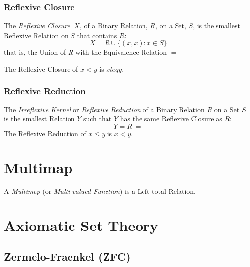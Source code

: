 \documentclass{article}
\begin{document}
\subsubsection{Reflexive Closure}\label{subsec:reflexive_closure}

The \emph{Reflexive Closure}, $X$, of a Binary Relation, $R$, on a
Set, $S$, is the smallest Reflexive Relation on $S$ that contains $R$:
\[
    X = R \cup \{(x,x) : x \in S\}
\]
that is, the Union of $R$ with the Equivalence Relation $=$.

The Reflexive Closure of $x < y$ is $x leq y$.



\subsubsection{Reflexive Reduction}\label{subsec:reflexive_reduction}

The \emph{Irreflexive Kernel} or \emph{Reflexive Reduction} of a
Binary Relation $R$ on a Set $S$ is the smallest Relation $Y$
such that $Y$ has the same Reflexive Closure as $R$:
\[
    Y = R \ =
\]
The Reflexive Reduction of $x \leq y$ is $x < y$.



\section{Multimap}\label{sec:multimap}

A \emph{Multimap} (or \emph{Multi-valued Function}) is a Left-total
Relation.



\section{Axiomatic Set Theory}\label{sec:axiomatic_set_theory}

\subsection{Zermelo-Fraenkel (ZFC)}\label{subsec:zermelo_fraenkel}
\end{document}
